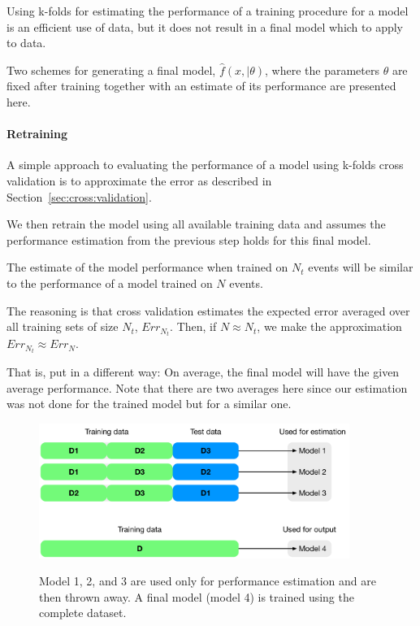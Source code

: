 Using k-folds for estimating the performance of a training procedure for a model is an efficient use of data, but it does not result in a final model which to apply to data.

Two schemes for generating a final model, $\hat{f}(x, | \theta)$, where the parameters $\theta$ are fixed after training together with an estimate of its performance are presented here.

\paragraph{Retraining}
A simple approach to evaluating the performance of a model using k-folds cross validation is to approximate the error as described in Section~\ref{sec:cross:validation}.

We then retrain the model using all available training data and assumes the performance estimation from the previous step holds for this final model.

The estimate of the model performance when trained on $N_t$ events will be similar to the performance of a model trained on $N$ events.

The reasoning is that cross validation estimates the expected error averaged over all training sets of size $N_t$, $Err_{N_t}$. Then, if $N \approx N_t$, we make the approximation $Err_{N_t} \approx Err_{N}$.

That is, put in a different way: On average, the final model will have the given average performance. Note that there are two averages here since our estimation was not done for the trained model but for a similar one.

\begin{figure}
\begin{center}
   \includegraphics[width=0.9\textwidth]{plots/cv/cv-workflows-retrain}
   \label{fig:workflow0}
   \caption{Model 1, 2, and 3 are used only for performance estimation and are then thrown away. A final model (model 4) is trained using the complete dataset.}
\end{center}
\end{figure}

